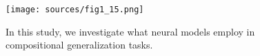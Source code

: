 \begin{figure}[t]
    \centering
    \texttt{[image: sources/fig1\_15.png]}
    \caption{In this study, we investigate what neural models employ in compositional generalization tasks.}
    \label{fig:1}
\end{figure}